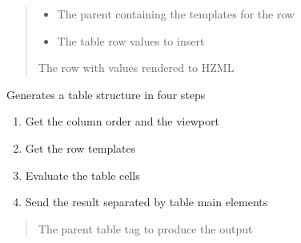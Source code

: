 \documentclass[letterpaper,10pt,english]{sphinxmanual}
\begin{document}
\begin{savenotes}
\begin{fulllineitems}
\begin{savenotes}
\begin{fulllineitems}
\begin{quote}
\begin{description}
\begin{itemize}
\item {} 
\sphinxAtStartPar
{} \textendash{} The parent containing the templates for the row

\item {} 
\sphinxAtStartPar
{} \textendash{} The table row values to insert

\end{itemize}

\sphinxAtStartPar
The row with values rendered to HZML

\end{description}\end{quote}

\end{fulllineitems}\end{savenotes}


\begin{savenotes}\begin{fulllineitems}
\label{\detokenize{eezz:eezz.http_agent.THttpAgent.generate_html_table}}
\pysigstartsignatures
{}
\pysigstopsignatures
\sphinxAtStartPar
Generates a table structure in four steps
\begin{enumerate}
%
\item {} 
\sphinxAtStartPar
Get the column order and the viewport

\item {} 
\sphinxAtStartPar
Get the row templates

\item {} 
\sphinxAtStartPar
Evaluate the table cells

\item {} 
\sphinxAtStartPar
Send the result separated by table main elements

\end{enumerate}
\begin{quote}\begin{description}
\sphinxAtStartPar
{} \textendash{} The parent table tag to produce the output


\end{description}
\end{quote}
\end{fulllineitems}
\end{savenotes}
\end{fulllineitems}
\end{savenotes}
\end{document}
